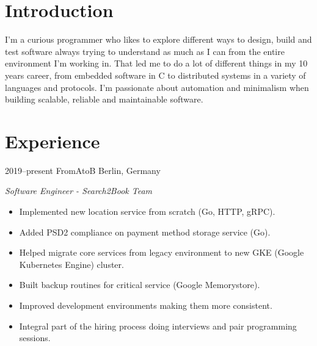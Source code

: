 \documentclass[]{friggeri-cv} %
\begin{document}

\section{Introduction}

\begin{entrylist}
\entry
{}
{}
{}
{
I'm a curious programmer who likes to explore different ways to design, build and test software
always trying to understand as much as I can from the entire environment I'm working in.
That led me to do a lot of different things in my 10 years career, from embedded
software in C to distributed systems in a variety of languages and protocols.
I'm passionate about automation and minimalism when building scalable, reliable
and maintainable software.
}
\end{entrylist}


\section{Experience}

\begin{entrylist}
\entry
{2019--present}
{FromAtoB}
{Berlin, Germany}
{\emph{Software Engineer - Search2Book Team} \\

\begin{itemize}
  \item Implemented new location service from scratch (Go, HTTP, gRPC).
  \item Added PSD2 compliance on payment method storage service (Go).
  \item Helped migrate core services from legacy environment to new GKE (Google Kubernetes Engine) cluster.
  \item Built backup routines for critical service (Google Memorystore).
  \item Improved development environments making them more consistent.
  \item Integral part of the hiring process doing interviews and pair programming sessions.
\end{itemize}

}
\end{entrylist}
\end{document}
